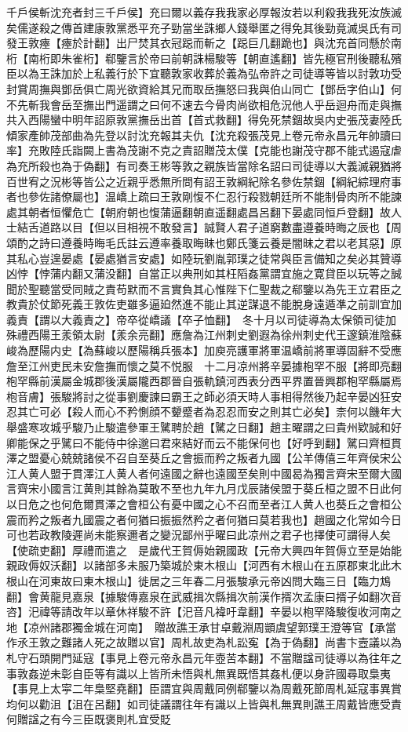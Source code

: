 千戶侯斬沈充者封三千戶侯】充曰爾以義存我我家必厚報汝若以利殺我我死汝族滅矣儒遂殺之傳首建康敦黨悉平充子勁當坐誅鄉人錢舉匿之得免其後勁竟滅吳氏有司發王敦瘞【瘞於計翻】出尸焚其衣冠跽而斬之【跽巨几翻跪也】與沈充首同懸於南桁【南桁即朱雀桁】郗鑒言於帝曰前朝誅楊駿等【朝直遙翻】皆先極官刑後聽私殯臣以為王誅加於上私義行於下宜聽敦家收葬於義為弘帝許之司徒導等皆以討敦功受封賞周撫與鄧岳俱亡周光欲資給其兄而取岳撫怒曰我與伯山同亡【鄧岳字伯山】何不先斬我會岳至撫出門遥謂之曰何不速去今骨肉尚欲相危況他人乎岳迴舟而走與撫共入西陽蠻中明年詔原敦黨撫岳出首【首式救翻】得免死禁錮故吳内史張茂妻陸氏傾家產帥茂部曲為先登以討沈充報其夫仇【沈充殺張茂見上卷元帝永昌元年帥讀曰率】充敗陸氏詣闕上書為茂謝不克之責詔贈茂太僕【克能也謝茂守郡不能式遏寇虐為充所殺也為于偽翻】有司奏王彬等敦之親族皆當除名詔曰司徒導以大義滅親猶將百世宥之況彬等皆公之近親乎悉無所問有詔王敦綱紀除名參佐禁錮【綱紀綜理府事者也參佐諸僚屬也】温嶠上疏曰王敦剛愎不仁忍行殺戮朝廷所不能制骨肉所不能諫處其朝者恒懼危亡【朝府朝也愎蒲逼翻朝直遥翻處昌呂翻下晏處同恒戶登翻】故人士結舌道路以目【但以目相視不敢發言】誠賢人君子道窮數盡遵養時晦之辰也【周頌酌之詩曰遵養時晦毛氏註云遵率養取晦昧也鄭氏箋云養是闇昧之君以老其惡】原其私心豈遑晏處【晏處猶言安處】如陸玩劉胤郭璞之徒常與臣言備知之矣必其贊導凶悖【悖蒲内翻又蒲没翻】自當正以典刑如其枉䧟姦黨謂宜施之寛貸臣以玩等之誠聞於聖聽當受同賊之責苟默而不言實負其心惟陛下仁聖裁之郗鑒以為先王立君臣之教貴於仗節死義王敦佐吏雖多逼廹然進不能止其逆謀退不能脫身遠遁凖之前訓宜加義責【謂以大義責之】帝卒從嶠議【卒子恤翻】　冬十月以司徒導為太保領司徒加殊禮西陽王羕領太尉【羕余亮翻】應詹為江州刺史劉遐為徐州刺史代王邃鎮淮陰蘇峻為歷陽内史【為蘇峻以歷陽稱兵張本】加庾亮護軍將軍温嶠前將軍導固辭不受應詹至江州吏民未安詹撫而懷之莫不悦服　十二月凉州將辛晏據枹罕不服【將即亮翻枹罕縣前漢屬金城郡後漢屬隴西郡晉自張軌鎮河西表分西平界置晉興郡枹罕縣屬焉枹音膚】張駿將討之從事劉慶諫曰霸王之師必須天時人事相得然後乃起辛晏凶狂安忍其亡可必【殺人而心不矜惻顔不顰蹙者為忍忍而安之則其亡必矣】柰何以饑年大舉盛寒攻城乎駿乃止駿遣參軍王騭聘於趙【騭之日翻】趙主曜謂之曰貴州欵誠和好卿能保之乎騭曰不能侍中徐邈曰君來結好而云不能保何也【好呼到翻】騭曰齊桓貫澤之盟憂心兢兢諸侯不召自至葵丘之會振而矜之叛者九國【公羊傳僖三年齊侯宋公江人黄人盟于貫澤江人黄人者何遠國之辭也遠國至矣則中國曷為獨言齊宋至爾大國言齊宋小國言江黄則其餘為莫敢不至也九年九月戊辰諸侯盟于葵丘桓之盟不日此何以日危之也何危爾貫澤之會桓公有憂中國之心不召而至者江人黄人也葵丘之會桓公震而矜之叛者九國震之者何猶曰振振然矜之者何猶曰莫若我也】趙國之化常如今日可也若政教陵遲尚未能察邇者之變況鄙州乎曜曰此凉州之君子也擇使可謂得人矣【使疏吏翻】厚禮而遣之　是歲代王賀傉始親國政【元帝大興四年賀傉立至是始能親政傉奴沃翻】以諸部多未服乃築城於東木根山【河西有木根山在五原郡東北此木根山在河東故曰東木根山】徙居之三年春二月張駿承元帝凶問大臨三日【臨力鴆翻】會黄龍見嘉泉【據駿傳嘉泉在武威揖次縣揖次前漢作揟次孟康曰揟子如翻次音咨】汜禕等請改年以章休祥駿不許【汜音凡褘吁韋翻】辛晏以枹罕降駿復收河南之地【凉州諸郡獨金城在河南】　贈故譙王承甘卓戴淵周顗虞望郭璞王澄等官【承當作氶王敦之難諸人死之故贈以官】周札故吏為札訟寃【為于偽翻】尚書卞壼議以為札守石頭開門延寇【事見上卷元帝永昌元年壺苦本翻】不當贈諡司徒導以為往年之事敦姦逆未彰自臣等有識以上皆所未悟與札無異既悟其姦札便以身許國尋取梟夷【事見上太寜二年梟堅堯翻】臣謂宜與周戴同例郗鑒以為周戴死節周札延寇事異賞均何以勸沮【沮在呂翻】如司徒議謂往年有識以上皆與札無異則譙王周戴皆應受責何贈諡之有今三臣既褒則札宜受貶